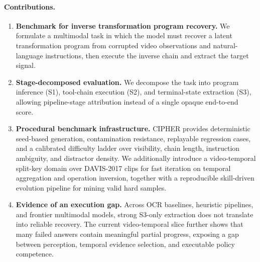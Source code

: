 \paragraph{Contributions.}
\begin{enumerate}
  \item \textbf{Benchmark for inverse transformation program recovery.}
        We formulate a multimodal task in which the model must recover a latent
        transformation program from corrupted video observations and
        natural-language instructions, then execute the inverse chain and
        extract the target signal.

  \item \textbf{Stage-decomposed evaluation.}
        We decompose the task into program inference (S1), tool-chain
        execution (S2), and terminal-state extraction (S3), allowing
        pipeline-stage attribution instead of a single opaque end-to-end score.

  \item \textbf{Procedural benchmark infrastructure.}
        CIPHER provides deterministic seed-based generation, contamination
        resistance, replayable regression cases, and a calibrated difficulty
        ladder over visibility, chain length, instruction ambiguity, and
        distractor density. We additionally introduce a video-temporal
        split-key domain over DAVIS-2017 clips for fast iteration on temporal
        aggregation and operation inversion, together with a reproducible
        skill-driven evolution pipeline for mining valid hard samples.

  \item \textbf{Evidence of an execution gap.}
        Across OCR baselines, heuristic pipelines, and frontier multimodal
        models, strong S3-only extraction does not translate into reliable
        recovery. The current video-temporal slice further shows that many
        failed answers contain meaningful partial progress, exposing a gap
        between perception, temporal evidence selection, and executable policy
        competence.
\end{enumerate}
